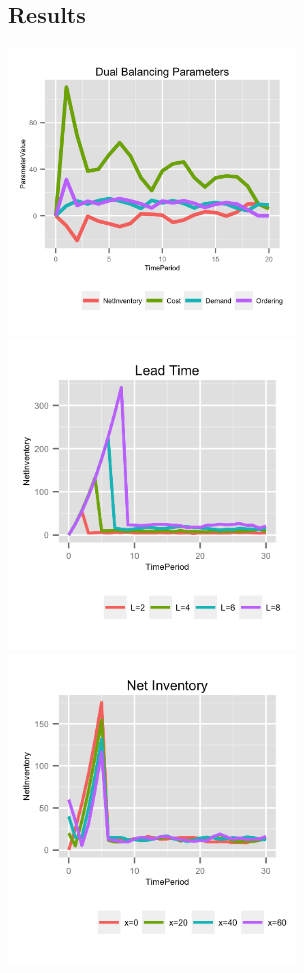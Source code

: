 \documentclass[twoside]{article}
\begin{document}
\begin{multicols}{2}
\section{Results}
  \includegraphics[width=3.0in]{figures/DualBalancingParameters.png}
  \includegraphics[width=3.0in]{figures/LeadTime.png}
  \includegraphics[width=3.0in]{figures/NetInventory.png}

\end{multicols}
\end{document}
